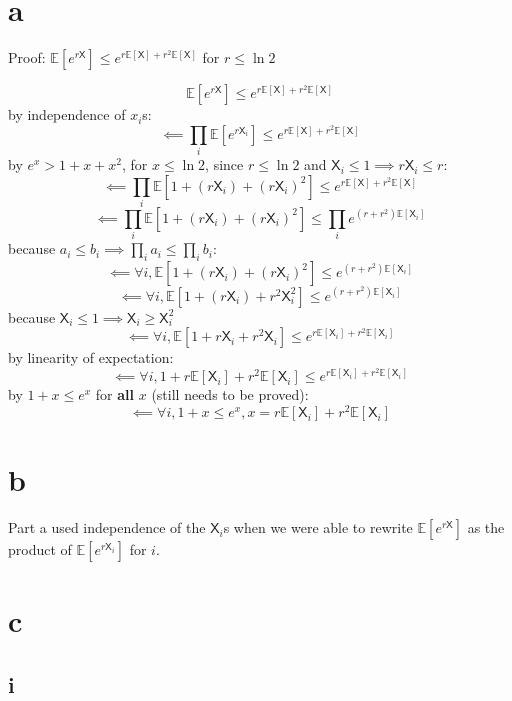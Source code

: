 \documentclass{article}
\newcommand{\E}{\mathbb{E}}
\newcommand{\rX}{\mathsf{X}}
\begin{document}
\section*{a}

Proof: $\E[e^{r\rX}] \leq e^{r\E[\rX] + r^2 \E[\rX]}$ for $r \leq \ln2$




$$\E[e^{r\rX}] \leq e^{r\E[\rX] + r^2 \E[\rX]}$$
by independence of $x_i$s:
$$\impliedby \prod_i \E[e^{r\rX_i}] \leq e^{r\E[\rX] + r^2 \E[\rX]}$$
by $e^x > 1 + x + x^2$, for $x \leq \ln2$, since $r \leq \ln2$ and $\rX_i \leq 1
\implies r\rX_i \leq r$:
$$\impliedby \prod_i \E[1+(r\rX_i) + (r\rX_i)^2] \leq e^{r\E[\rX] + r^2 \E[\rX]}$$
$$\impliedby \prod_i \E[1+(r\rX_i) + (r\rX_i)^2] \leq \prod_i e^{(r+r^2)\E[\rX_i]}$$
because $a_i \leq b_i \implies \prod_i a_i \leq \prod_i b_i$:
$$\impliedby \forall i, \E[1 + (r\rX_i) + (r\rX_i)^2] \leq e^{(r+r^2)\E[\rX_i]}$$
$$\impliedby \forall i, \E[1 + (r\rX_i) + r^2\rX_i^2] \leq e^{(r+r^2)\E[\rX_i]}$$
because $\rX_i \leq 1 \implies \rX_i \geq \rX_i^2$
$$\impliedby \forall i, \E[1 + r\rX_i + r^2\rX_i] \leq e^{r\E[\rX_i]+r^2\E[\rX_i]}$$
by linearity of expectation:
$$\impliedby \forall i, 1 + r\E[\rX_i] + r^2\E[\rX_i] \leq e^{r\E[\rX_i]+r^2\E[\rX_i]}$$
by $1 + x \leq e^x$ for \textbf{all} $x$ (still needs to be proved):
$$\impliedby \forall i, 1 + x \leq e^x, x = r\E[\rX_i] + r^2\E[\rX_i]$$

\section*{b}

Part a used independence of the $\rX_i$s when we were able to rewrite
$\E[e^{r\rX}]$ as the product of $\E[e^{r\rX_i}]$ for $i$.

\pagebreak

\section*{c}

\subsection*{i}

\end{document}
